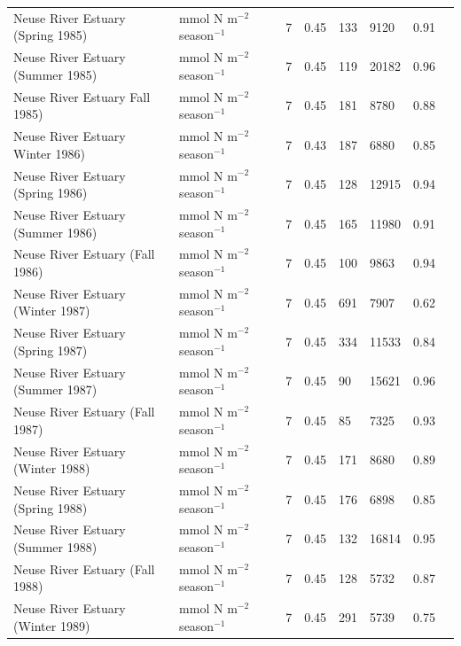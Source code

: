 \documentclass[article]{jss}
\begin{document}
\begin{table}[ht]
\begin{center}
\begin{tiny}
\begin{tabularx}{\textwidth}{llllllll}
      Neuse River Estuary (Spring 1985) & mmol N m$^{-2}$ season$^{-1}$ &   7 & 0.45 & 133 & 9120 & 0.91 & \citet{christian03} \\
      Neuse River Estuary (Summer 1985) & mmol N m$^{-2}$ season$^{-1}$ &   7 & 0.45 & 119 & 20182 & 0.96 & \citet{christian03} \\
      Neuse River Estuary Fall 1985) & mmol N m$^{-2}$ season$^{-1}$ &   7 & 0.45 & 181 & 8780 & 0.88 & \citet{christian03} \\
      Neuse River Estuary Winter 1986) & mmol N m$^{-2}$ season$^{-1}$ &   7 & 0.43 & 187 & 6880 & 0.85 & \citet{christian03} \\
      Neuse River Estuary (Spring 1986) & mmol N m$^{-2}$ season$^{-1}$ &   7 & 0.45 & 128 & 12915 & 0.94 & \citet{christian03} \\
      Neuse River Estuary (Summer 1986) & mmol N m$^{-2}$ season$^{-1}$ &   7 & 0.45 & 165 & 11980 & 0.91 & \citet{christian03} \\
      Neuse River Estuary (Fall 1986) & mmol N m$^{-2}$ season$^{-1}$ &   7 & 0.45 & 100 & 9863 & 0.94 & \citet{christian03} \\
      Neuse River Estuary (Winter 1987) & mmol N m$^{-2}$ season$^{-1}$ &   7 & 0.45 & 691 & 7907 & 0.62 & \citet{christian03} \\
      Neuse River Estuary (Spring 1987) & mmol N m$^{-2}$ season$^{-1}$ &   7 & 0.45 & 334 & 11533 & 0.84 & \citet{christian03} \\
      Neuse River Estuary (Summer 1987) & mmol N m$^{-2}$ season$^{-1}$ &   7 & 0.45 &  90 & 15621 & 0.96 & \citet{christian03} \\
      Neuse River Estuary (Fall 1987) & mmol N m$^{-2}$ season$^{-1}$ &   7 & 0.45 &  85 & 7325 & 0.93 & \citet{christian03} \\
      Neuse River Estuary (Winter 1988) & mmol N m$^{-2}$ season$^{-1}$ &   7 & 0.45 & 171 & 8680 & 0.89 & \citet{christian03} \\
      Neuse River Estuary (Spring 1988) & mmol N m$^{-2}$ season$^{-1}$ &   7 & 0.45 & 176 & 6898 & 0.85 & \citet{christian03} \\
      Neuse River Estuary (Summer 1988) & mmol N m$^{-2}$ season$^{-1}$ &   7 & 0.45 & 132 & 16814 & 0.95 & \citet{christian03} \\
      Neuse River Estuary (Fall 1988) & mmol N m$^{-2}$ season$^{-1}$ &   7 & 0.45 & 128 & 5732 & 0.87 & \citet{christian03} \\
      Neuse River Estuary (Winter 1989) & mmol N m$^{-2}$ season$^{-1}$ &   7 & 0.45 & 291 & 5739 & 0.75 & \citet{christian03} \\

\end{tabularx}
\end{tiny}
\end{center}
\end{table}
\end{document}
